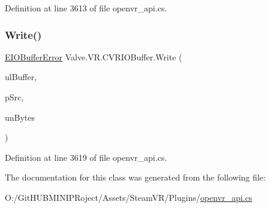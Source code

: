 Definition at line 3613 of file openvr\+\_\+api.\+cs.

\mbox{\label{class_valve_1_1_v_r_1_1_c_v_r_i_o_buffer_ad122333f40ea2ee22b3948cc64a3208f}} 
\subsubsection{\texorpdfstring{Write()}{Write()}}
{\footnotesize\ttfamily \mbox{\hyperlink{namespace_valve_1_1_v_r_a11d6c73dbb80923b10779c007bb8c154}{E\+I\+O\+Buffer\+Error}} Valve.\+V\+R.\+C\+V\+R\+I\+O\+Buffer.\+Write (\begin{DoxyParamCaption}\item[{ulong}]{ul\+Buffer,  }\item[{Int\+Ptr}]{p\+Src,  }\item[{uint}]{un\+Bytes }\end{DoxyParamCaption})}



Definition at line 3619 of file openvr\+\_\+api.\+cs.



The documentation for this class was generated from the following file\+:\begin{DoxyCompactItemize}
\item 
O\+:/\+Git\+H\+U\+B\+M\+I\+N\+I\+P\+Roject/\+Assets/\+Steam\+V\+R/\+Plugins/\mbox{\hyperlink{openvr__api_8cs}{openvr\+\_\+api.\+cs}}\end{DoxyCompactItemize}
